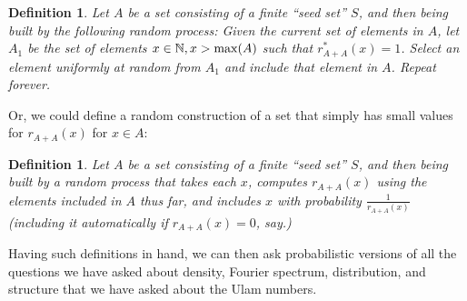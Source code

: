 \documentclass{report}
\newtheorem{definition}[theorem]{Definition}
\theoremstyle{remark}
\numberwithin{equation}{section}
\begin{document}
\begin{definition}
  Let $A$ be a set consisting of a finite ``seed set'' $S$, and then
  being built by the following random process: Given the current set
  of elements in $A$, let $A_1$ be the set of elements
  $x \in \mathbb{N}, x > \max(A)$ such that $r^*_{A+A}(x) = 1$.  Select an
  element uniformly at random from $A_1$ and include that element in
  $A$.  Repeat forever.  
\end{definition}

Or, we could define a random construction of a set that simply has
small values for $r_{A+A}(x)$ for $x \in A$: 

\begin{definition}
Let $A$ be a set consisting of a finite ``seed set'' $S$, and then
being built by a random process that takes each $x$, computes
$r_{A+A}(x)$ using the elements included in $A$ thus far, and includes
$x$ with probability $\frac{1}{r_{A+A}(x)}$ (including it
automatically if $r_{A+A}(x) = 0$, say.)
\end{definition}

Having such definitions in hand, we can then ask probabilistic
versions of all the questions we have asked about density, Fourier
spectrum, distribution, and structure that we have asked about the
Ulam numbers.


{}

\end{document}
